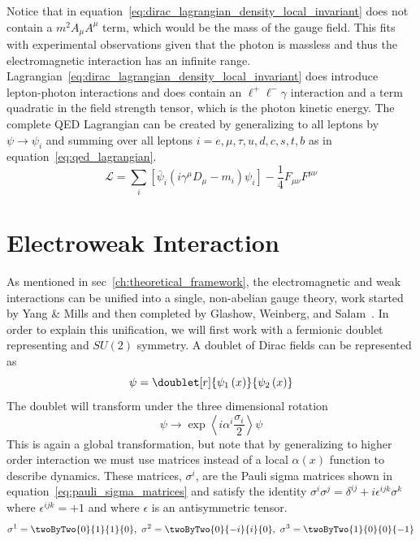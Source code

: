 Notice that in equation~\ref{eq:dirac_lagrangian_density_local_invariant} does not contain a $m^{2}A_{\mu}A^{\mu}$ term, which would be the mass of the gauge field.
This fits with experimental observations given that the photon is massless and thus the electromagnetic interaction has an infinite range.
Lagrangian~\ref{eq:dirac_lagrangian_density_local_invariant} does introduce lepton-photon interactions and does contain an $\ell^{+}\ell^{-}\gamma$ interaction and a term quadratic in the field strength tensor, which is the photon kinetic energy.
The complete QED Lagrangian can be created by generalizing to all leptons by $\psi\rightarrow\psi_{i}$ and summing over all leptons $i=e,\mu,\tau,u,d,c,s,t,b$ as in equation~\ref{eq:qed_lagrangian}.
\begin{equation}\label{eq:qed_lagrangian}
	\mathcal{L}=\sum_{i}\left[\bar{\psi}_{i}\left(i\gamma^{\mu}D_{\mu}-m_{i}\right)\psi_{i}\right]-\frac{1}{4}F_{\mu\nu}F^{\mu\nu}
\end{equation}

\section{Electroweak Interaction}
\label{sec:electroweak_interaction}

As mentioned in sec~\ref{ch:theoretical_framework}, the electromagnetic and weak interactions can be unified into a single, non-abelian gauge theory, work started by Yang \& Mills and then completed by Glashow, Weinberg, and Salam~\cite{Dawson:1998yi}.
In order to explain this unification, we will first work with a fermionic doublet representing and $SU\left(2\right)$ symmetry.
A doublet of Dirac fields can be represented as
\begin{equation}\label{eq:dirac_field_doublet}
	\psi=\doublet[r]{\psi_{1}\left(x\right)}{\psi_{2}\left(x\right)}
\end{equation}
The doublet will transform under the three dimensional rotation
\begin{equation}\label{eq:three_dimensional_rotation}
	\psi\rightarrow\exp\left<i\alpha^{i}\frac{\sigma_{i}}{2}\right>\psi
\end{equation}
This is again a global transformation, but note that by generalizing to higher order interaction we must use matrices instead of a local $\alpha\left(x\right)$ function to describe dynamics.
These matrices, $\sigma^{i}$, are the Pauli sigma matrices shown in equation~\ref{eq:pauli_sigma_matrices} and satisfy the identity $\sigma^{i}\sigma^{j}=\delta^{ij}+i\epsilon^{ijk}\sigma^{k}$ where $\epsilon^{ijk}=+1$ and where $\epsilon$ is an antisymmetric tensor.
\begin{equation}\label{eq:pauli_sigma_matrices}
	\sigma^{1}=\twoByTwo{0}{1}{1}{0},\text{ }\sigma^{2}=\twoByTwo{0}{-i}{i}{0},\text{ }\sigma^{3}=\twoByTwo{1}{0}{0}{-1}
\end{equation}

